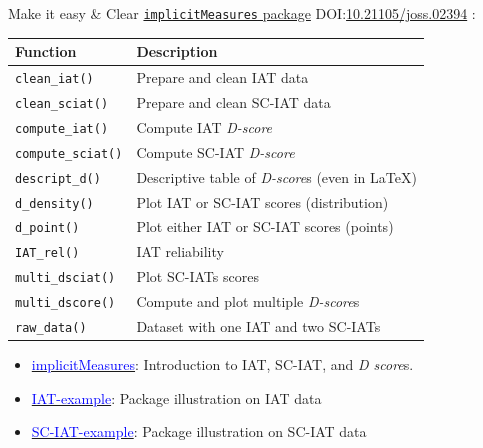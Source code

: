 \documentclass[compress]{beamer}
\begin{document}
\begin{frame}{Make it easy \& Clear}
	\href{https://cran.r-project.org/web/packages/implicitMeasures/index.html}{\texttt{implicitMeasures} package} DOI:\href{https://joss.theoj.org/papers/10.21105/joss.02394}{10.21105/joss.02394} : 
	
	\vspace{2mm}
	\begin{small}
		\begin{tabular}{p{2.3cm}p{8cm}}
			\hline
			Function & Description \\
			\hline
			\texttt{clean\_iat()} & Prepare and clean IAT data\\
			\texttt{clean\_sciat()} & Prepare and clean SC-IAT data\\
			\texttt{compute\_iat()} & Compute IAT \emph{D-score}\\
			\texttt{compute\_sciat()} & Compute SC-IAT \emph{D-score} \\
			\texttt{descript\_d()} & Descriptive table of \emph{D-score}s (even in \LaTeX) \\  
			\texttt{d\_density()} & Plot IAT or SC-IAT scores (distribution)\\
			\texttt{d\_point()} & Plot either IAT or SC-IAT scores (points)\\
			\texttt{IAT\_rel()} & IAT reliability\\
			\texttt{multi\_dsciat()} & Plot SC-IATs scores\\
			\texttt{multi\_dscore()} & Compute and plot multiple \emph{D-score}s\\
			\texttt{raw\_data()} & Dataset with one IAT and two SC-IATs\\
			\hline
		\end{tabular}
	\end{small}
	
	\begin{small}
		\begin{itemize}
			\item \href{https://cran.r-project.org/web/packages/implicitMeasures/vignettes/implicitMeasures.html}{\textcolor{blue}{implicitMeasures}}: Introduction to IAT, SC-IAT, and \emph{D score}s.
			\item \href{https://cran.r-project.org/web/packages/implicitMeasures/vignettes/IAT-example.html}{\textcolor{blue}{IAT-example}}: Package illustration on IAT data
			\item \href{https://cran.r-project.org/web/packages/implicitMeasures/vignettes/SC-IAT-example.html}{\textcolor{blue}{SC-IAT-example}}: Package illustration on SC-IAT data
		\end{itemize}
	\end{small}
\end{frame}
\end{document}
